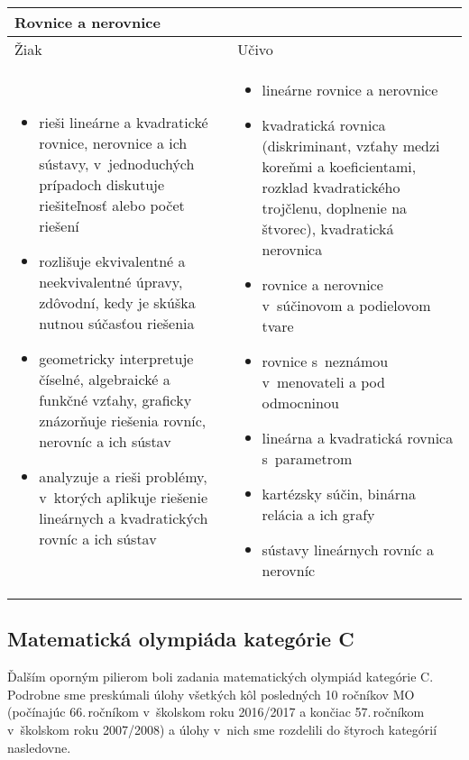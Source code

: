 \noindent \begin{tabularx}{\textwidth} { XX }
  \toprule
\multicolumn{2}{p{\textwidth}}{Rovnice a nerovnice} \\ \midrule
  Žiak & Učivo \\ \vspace{-10pt}
  \begin{itemize}
    \item rieši lineárne a kvadratické rovnice, nerovnice a ich sústavy, v~jednoduchých prípadoch diskutuje riešiteľnosť alebo počet riešení
    \item rozlišuje ekvivalentné a neekvivalentné úpravy, zdôvodní, kedy je skúška nutnou súčasťou riešenia
    \item geometricky interpretuje číselné, algebraické a funkčné vzťahy, graficky znázorňuje riešenia rovníc, nerovníc a ich sústav
    \item analyzuje a rieši problémy, v~ktorých aplikuje riešenie lineárnych a kvadratických rovníc a ich sústav
  \end{itemize} & \vspace{-10pt}
  \begin{itemize}
    \item lineárne rovnice a nerovnice
    \item kvadratická rovnica (diskriminant, vzťahy medzi koreňmi a koeficientami, rozklad kvadratického trojčlenu, doplnenie na štvorec), kvadratická nerovnica
    \item rovnice a nerovnice v~súčinovom a podielovom tvare
    \item rovnice s~neznámou v~menovateli a pod odmocninou
    \item lineárna a kvadratická rovnica s~parametrom
    \item kartézsky súčin, binárna relácia a ich grafy
    \item sústavy lineárnych rovníc a nerovníc
  \end{itemize}\\ \bottomrule
\end{tabularx}

\subsection*{Matematická olympiáda kategórie C}

Ďalším oporným pilierom boli zadania matematických olympiád kategórie C. Podrobne sme preskúmali úlohy všetkých kôl posledných 10 ročníkov MO (počínajúc 66.\,ročníkom v~školskom roku 2016/2017 a končiac 57.\,ročníkom v~školskom roku 2007/2008) a úlohy v~nich sme rozdelili do štyroch kategórií nasledovne.


